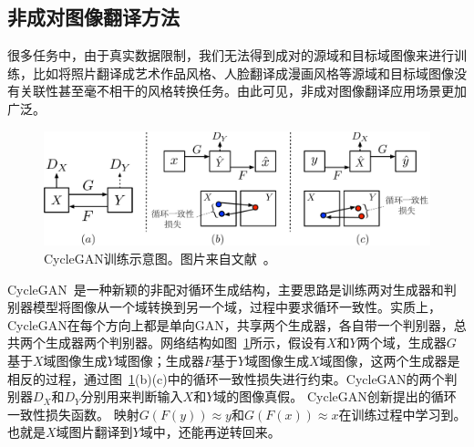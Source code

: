 \subsection{非成对图像翻译方法}
很多任务中，由于真实数据限制，我们无法得到成对的源域和目标域图像来进行训练，比如将照片翻译成艺术作品风格、人脸翻译成漫画风格等源域和目标域图像没有关联性甚至毫不相干的风格转换任务。由此可见，非成对图像翻译应用场景更加广泛。

\begin{figure}[ht]
    \centering
	\includegraphics[width=\textwidth]{figures/cyclegan.pdf}
	\caption{CycleGAN训练示意图。图片来自文献~\cite{zhu2017unpaired}。}
	\label{fig:cyclegan}
\end{figure}

CycleGAN~\cite{zhu2017unpaired}是一种新颖的非配对循环生成结构，主要思路是训练两对生成器和判别器模型将图像从一个域转换到另一个域，过程中要求循环一致性。实质上，CycleGAN在每个方向上都是单向GAN，共享两个生成器，各自带一个判别器，总共两个生成器两个判别器。网络结构如图~\ref{fig:cyclegan}所示，假设有$X$和$Y$两个域，生成器$G$基于$X$域图像生成$Y$域图像；生成器$F$基于$Y$域图像生成$X$域图像，这两个生成器是相反的过程，通过图~\ref{fig:cyclegan}(b)(c)中的循环一致性损失进行约束。CycleGAN的两个判别器$D_X$和$D_Y$分别用来判断输入$X$和$Y$域的图像真假。%
CycleGAN创新提出的循环一致性损失函数。
映射$ G(F(y)) \approx y$和$ G(F(x)) \approx x$在训练过程中学习到。也就是$X$域图片翻译到$Y$域中，还能再逆转回来。%

